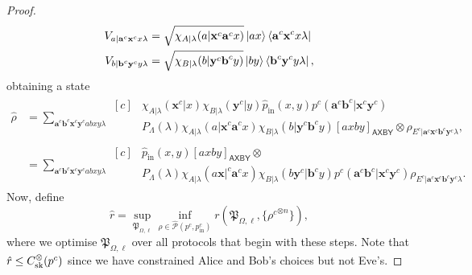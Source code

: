 \documentclass[10pt, a4paper]{article}
\numberwithin{equation}{section} %
\theoremstyle{definition}
\theoremstyle{plain}
\newcommand{\?}{\mathrel{?}} %
\newcommand{\cvec}[1]{\boldsymbol{\mathbf{#1}}}    %
\newcommand{\crv}[1]{\mathsf{#1}}
\newcommand{\proj}[2][]{{[#2]}_{#1}}
\newcommand{\compatstates}[3][]{\hat{\mathcal{P}}#1(#2,#3)}
\newcommand{\proto}[2][\ell]{\mathfrak{P}_{#2, #1}}
\newcommand{\prin}[1][p]{#1_{\mathrm{in}}}
\newcommand{\sk}{\rm sk}
\begin{document}
\begin{proof}
\begin{align*}
                        V_{a|\cvec{a}^c\cvec{x}^c x\lambda} &= \sqrt{\chi_{A|\lambda}(a|\cvec{x}^c\cvec{a}^cx)} \ket{ax}\bra{\cvec{a}^c\cvec{x}^c x\lambda} \\
                        V_{b|\cvec{b}^c\cvec{y}^c y\lambda} &= \sqrt{\chi_{B|\lambda}(b|\cvec{y}^c\cvec{b}^cy)} \ket{by}\bra{\cvec{b}^c\cvec{y}^c y\lambda},
                      \end{align*}
                      obtaining a state
                      \begin{align*}
                        \hat{\rho} &= \sum_{\cvec{a}^c\cvec{b}^c \cvec{x}^c\cvec{y}^c abxy\lambda} \begin{aligned}[c]
          & \chi_{A|\lambda}(\cvec{x}^c|x) \chi_{B|\lambda}(\cvec{y}^c|y) \prin[\hat{p}](x,y) p^c(\cvec{a}^c\cvec{b}^c|\cvec{x}^c\cvec{y}^c) \\
          & P_{\Lambda}(\lambda) \chi_{A|\lambda}(a|\cvec{x}^c\cvec{a}^cx) \chi_{B|\lambda}(b|\cvec{y}^c\cvec{b}^cy) \proj[\crv{AXBY}]{axby} \otimes \rho_{E^c|\cvec{a}^c\cvec{x}^c \cvec{b}^c\cvec{y}^c\lambda},
                        \end{aligned} \\
                                   &= \sum_{\cvec{a}^c\cvec{b}^c \cvec{x}^c\cvec{y}^c abxy\lambda} \begin{aligned}[c]
          & \prin[\hat{p}](x,y) \proj[\crv{AXBY}]{axby} \otimes \\
          & P_{\Lambda}(\lambda) \chi_{A|\lambda}(a\cvec{x}|^c\cvec{a}^cx) \chi_{B|\lambda}(b\cvec{y}^c|\cvec{b}^cy) p^c(\cvec{a}^c\cvec{b}^c|\cvec{x}^c\cvec{y}^c) \rho_{E^c|\cvec{a}^c\cvec{x}^c \cvec{b}^c\cvec{y}^c\lambda}.
                                   \end{aligned}
                        \end{align*}
                        Now, define
                        \begin{equation}\label{eqn:hatrdef}
                          \hat{r} = \sup_{\proto{\Omega}} \inf_{\rho \in \compatstates{p^c}{\prin^c}} r(\proto{\Omega}, \{ {\rho^c}^{\otimes n} \}),
                        \end{equation}
                        where we optimise \(\proto{\Omega}\) over all protocols that begin with these steps. Note that \(\hat{r} \leq C_{\sk}^{\otimes}(p^c)\) since we have constrained Alice and Bob's choices but not Eve's.


\end{proof}
\end{document}
